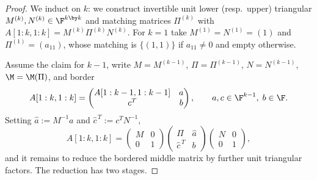 \begin{proof}
  We induct on $k$: we construct invertible unit lower (resp.\ upper)
  triangular $M^{(k)}, N^{(k)} \in \F^{k \by k}$ and matching matrices
  $\Pi^{(k)}$ with $A[1:k,1:k] = M^{(k)} \Pi^{(k)} N^{(k)}$.  For $k = 1$
  take $M^{(1)} = N^{(1)} = (1)$ and $\Pi^{(1)} = (a_{11})$, whose matching
  is $\{(1,1)\}$ if $a_{11} \neq 0$ and empty otherwise.

  Assume the claim for $k - 1$, write $M = M^{(k-1)}$, $\Pi = \Pi^{(k-1)}$,
  $N = N^{(k-1)}$, $\M = \M(\Pi)$, and border
  \[
    A[1:k,1:k] =
    \begin{pmatrix}
      A[1:k-1,1:k-1] & a\\
      c^T & b
    \end{pmatrix},
    \qquad a, c \in \F^{k-1}, \; b \in \F .
  \]
  Setting $\widehat a := M^{-1} a$ and $\widehat c^{\,T} := c^T N^{-1}$,
  \begin{equation}\label{eq:border-lu}
    A[1:k,1:k] =
    \begin{pmatrix}
      M & 0\\
      0 & 1
    \end{pmatrix}
    \begin{pmatrix}
      \Pi & \widehat a\\
      \widehat c^{\,T} & b
    \end{pmatrix}
    \begin{pmatrix}
      N & 0\\
      0 & 1
    \end{pmatrix},
  \end{equation}
  and it remains to reduce the bordered middle matrix by further unit
  triangular factors.  The reduction has two stages.


\end{proof}
